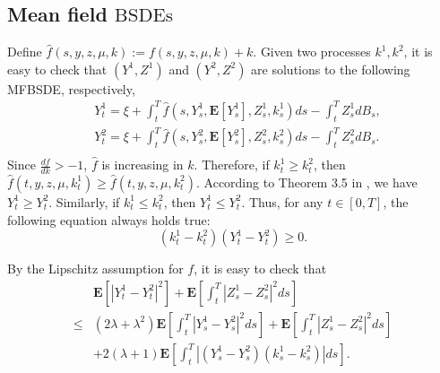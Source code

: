 \documentclass[10pt]{article}%
\numberwithin{equation}{section}
\def \E{\mathbf{E}}
\begin{document}
\subsection{Mean field $\text{BSDEs}$}
  Define $\hat{f}(s,y,z,\mu,k):=f(s,y,z,\mu,k)+k$.  Given two processes $k^1,k^2$, it is easy to check that $(Y^1,Z^1)$ and $(Y^2,Z^2)$ are solutions to the following MFBSDE, respectively,
    \begin{equation*}
    \begin{split}
      &Y_t^1=\xi+\int_{t}^{T} \hat{f}(s,Y_s^1,\mathbf{E}[Y_s^1],Z_s^1,k_s^1)ds-\int_{t}^{T}Z^1_sdB_s,\\ 
       &Y_t^2=\xi+\int_{t}^{T} \hat{f}(s,Y_s^2,\mathbf{E}[Y_s^2],Z_s^2,k_s^2)ds-\int_{t}^{T}Z^2_sdB_s.\\   
    \end{split} 
    \end{equation*}
    Since $\frac{df}{dk}>-1$, {\color{red}$\hat{f}$} is increasing in $k$. Therefore, if $k^1_t\geq k^2_t$, then $\hat{f}(t,y,z,\mu,k^1_t)\geq \hat{f}(t,y,z,\mu,k^2_t)$. According to Theorem 3.5 in \cite{CXZ}, we have $Y^1_t\geq Y^2_t$. Similarly, if $k^1_t\leq k^2_t$, then $Y^1_t\leq Y^2_t$. Thus, for any $t\in[0,T]$, the following equation always holds true:
    \begin{equation}\label{k1k2y1y2}
        (k^1_t-k^2_t)(Y^1_t-Y^2_t)\geq 0.
    \end{equation}
     {\color{red}  By the Lipschitz assumption for $f$, it is easy to check that 
    \begin{align*}
        & \mathbf{E}\left[|Y_t^1-Y_t^2|^2\right]+\mathbf{E}\left[\int_{t}^{T}|Z_s^1-Z_s^2|^2ds\right]\\
        \leq &(2\lambda+\lambda^2)\E\left[\int_t^T|Y^1_s-Y^2_s|^2ds\right]+\mathbf{E}\left[\int_{t}^{T}|Z_s^1-Z_s^2|^2ds\right]\\
        &+2(\lambda+1)\E\left[\int_t^T|(Y^1_s-Y^2_s)(k^1_s-k^2_s)|ds\right].
    \end{align*}
 
  }
\end{document}

